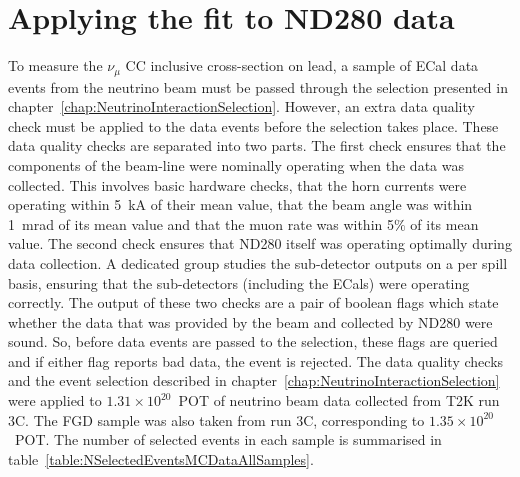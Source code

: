 \section{Applying the fit to ND280 data}
\label{sec:ND280DataFit}
To measure the $\nu_\mu$ CC inclusive cross-section on lead, a sample of ECal data events from the neutrino beam must be passed through the selection presented in chapter~\ref{chap:NeutrinoInteractionSelection}.  However, an extra data quality check must be applied to the data events before the selection takes place.  These data quality checks are separated into two parts.  The first check ensures that the components of the beam-line were nominally operating when the data was collected.  This involves basic hardware checks, that the horn currents were operating within 5~kA of their mean value, that the beam angle was within 1~mrad of its mean value and that the muon rate was within 5$\%$ of its mean value.  The second check ensures that ND280 itself was operating optimally during data collection.  A dedicated group studies the sub-detector outputs on a per spill basis, ensuring that the sub-detectors (including the ECals) were operating correctly.  The output of these two checks are a pair of boolean flags which state whether the data that was provided by the beam and collected by ND280 were sound.  So, before data events are passed to the selection, these flags are queried and if either flag reports bad data, the event is rejected.
\newline
\newline
The data quality checks and the event selection described in chapter~\ref{chap:NeutrinoInteractionSelection} were applied to $1.31\times 10^{20}$~POT of neutrino beam data collected from T2K run 3C.  The FGD sample was also taken from run 3C, corresponding to $1.35\times10^{20}$~POT.  The number of selected events in each sample is summarised in table~\ref{table:NSelectedEventsMCDataAllSamples}.
